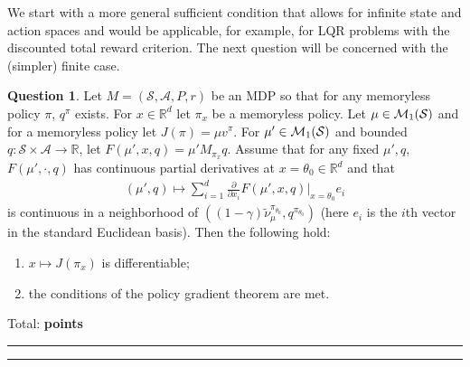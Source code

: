 \documentclass{article}
\newcommand{\R}{\mathbb{R}}
\DeclareMathOperator*{\1}{\mathbbm{1}}
\newcommand{\0}{\mathbf{0}}
\newcounter{DocPoints} %
\newcounter{QuestionPoints} %
\newcommand{\tpoints}[1]{        %
	\ifthenelse{\isempty{#1}}%
	{%
	}%
	{%
		\addtocounter{DocPoints}{#1}
		\addtocounter{QuestionPoints}{#1}
	}													 %
	\par\mbox{}\par\noindent\hfill {Total: \bf \arabic{QuestionPoints}\xspace points}\par\mbox{}\par\hrule\hrule
	\setcounter{QuestionPoints}{0}
}
\theoremstyle{definition}
\newtheorem{question}{Question}
\theoremstyle{remark}
\theoremstyle{theorem}
\newcommand{\cS}{\mathcal{S}}
\newcommand{\cA}{\mathcal{A}}
\begin{document}
We start with a
more general sufficient condition that allows for infinite state and action spaces
and would be applicable, for example, for LQR problems with the discounted total reward criterion.
The next question will be concerned with the (simpler) finite case.

\begin{question}
Let $M = (\cS,\cA,P,r)$ be an MDP so that for any memoryless policy $\pi$, $q^\pi$ exists.
For $x\in \mathbb{R}^d$ let $\pi_x$ be a memoryless policy.
Let $\mu \in \cM_1(\cS)$ and for a memoryless policy let $J(\pi) = \mu v^\pi$.
For $\mu'\in \cM_1(\cS)$ and bounded $q: \cS \times \cA \to \R$, 
let $F(\mu',x,q) = \mu' M_{\pi_x} q$.
Assume that for any fixed $\mu',q$, $F(\mu',\cdot,q)$ 
 has continuous partial derivatives at $x=\theta_0\in \mathbb{R}^d$ 
and that
\begin{align*}
(\mu',q) \mapsto \sum_{i=1}^d \frac{\partial}{\partial x_i} F(\mu',x,q)|_{x=\theta_0} e_i
\end{align*}
is continuous in a neighborhood of $( (1-\gamma)\tilde \nu_\mu^{\pi_{\theta_0}}, q^{\pi_{\theta_0}} )$
(here $e_i$ is the $i$th vector in the standard Euclidean basis).
 Then the following hold:
\begin{enumerate}
\item $x\mapsto J(\pi_x)$ is differentiable;
\item the conditions of the policy gradient theorem are met.
\end{enumerate}
\tpoints{50}
\end{question}
\end{document}
